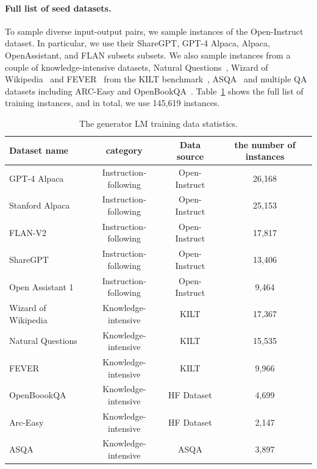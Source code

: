 \paragraph{Full list of seed datasets.}
To sample diverse input-output pairs, we sample instances of the Open-Instruct~\citep{wang2023far} dataset. In particular, we use their ShareGPT, GPT-4 Alpaca, Alpaca, OpenAssistant, and FLAN subsets subsets. 
We also sample instances from a couple of knowledge-intensive datasets, Natural Questions~\citep{kwiatkowski-etal-2019-natural}, Wizard of Wikipedia~\citep{dinan2018wizard} and FEVER~\citep{thorne-etal-2018-fever} from the KILT benchmark~\citep{petroni-etal-2021-kilt}, ASQA~\citep{stelmakh2022asqa} and multiple QA datasets including ARC-Easy and OpenBookQA~\citep{mihaylov-etal-2018-suit}. 
Table~\ref{tab:mgen_training} shows the full list of training instances, and in total, we use {145,619} instances. 
\begin{table}[t!]
\centering
\small
\begin{tabular}{l|c c c}
\toprule
Dataset name & category & Data source & the number of instances  \\
\midrule
GPT-4 Alpaca &  Instruction-following & Open-Instruct & 26,168\\ 
Stanford Alpaca &  Instruction-following & Open-Instruct & 25,153 \\ 
FLAN-V2 &  Instruction-following & Open-Instruct &17,817 \\
ShareGPT & Instruction-following & Open-Instruct & 13,406 \\
Open Assistant 1 &  Instruction-following & Open-Instruct & 9,464 \\
Wizard of Wikipedia &  Knowledge-intensive & KILT & 17,367  \\
Natural Questions &  Knowledge-intensive & KILT & 15,535\\ 
FEVER &  Knowledge-intensive & KILT & 9,966\\ 
OpenBoookQA &  Knowledge-intensive & HF Dataset & 4,699 \\ 
Arc-Easy &  Knowledge-intensive & HF Dataset & 2,147 \\ 
ASQA &  Knowledge-intensive & ASQA &3,897 \\ 
\bottomrule
\end{tabular}
\caption{The generator LM \mgen training data statistics.}\label{tab:mgen_training}
\end{table}


